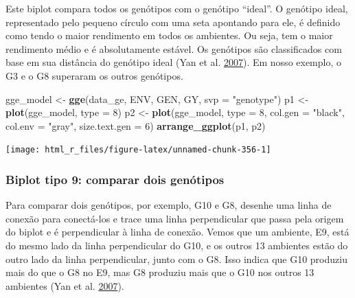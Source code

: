 \documentclass[
]{book}
\newenvironment{Shaded}{\begin{snugshade}}{\end{snugshade}}
\newcommand{\DataTypeTok}[1]{\textcolor[rgb]{0.13,0.29,0.53}{#1}}
\newcommand{\DecValTok}[1]{\textcolor[rgb]{0.00,0.00,0.81}{#1}}
\newcommand{\KeywordTok}[1]{\textcolor[rgb]{0.13,0.29,0.53}{\textbf{#1}}}
\newcommand{\NormalTok}[1]{#1}
\newcommand{\StringTok}[1]{\textcolor[rgb]{0.31,0.60,0.02}{#1}}
\numberwithin{equation}{section}
\newcommand{\indt}[1]{\index{#1|ST}}
\begin{document}
Este biplot compara todos os genótipos com o genótipo ``ideal''. O genótipo ideal, representado pelo pequeno círculo com uma seta apontando para ele, é definido como tendo o maior rendimento em todos os ambientes. Ou seja, tem o maior rendimento médio e é absolutamente estável. Os genótipos são classificados com base em sua distância do genótipo ideal (Yan et al. \protect\hyperlink{ref-Yan2007}{2007}). Em nosso exemplo, o G3 e o G8 superaram os outros genótipos.
\indt{biplot}

\begin{Shaded}
\begin{Highlighting}[]
\NormalTok{gge\_model \textless{}{-}}\StringTok{ }\KeywordTok{gge}\NormalTok{(data\_ge, ENV, GEN, GY, }\DataTypeTok{svp =} \StringTok{"genotype"}\NormalTok{)}
\NormalTok{p1 \textless{}{-}}\StringTok{ }\KeywordTok{plot}\NormalTok{(gge\_model, }\DataTypeTok{type =} \DecValTok{8}\NormalTok{)}
\NormalTok{p2 \textless{}{-}}\StringTok{ }\KeywordTok{plot}\NormalTok{(gge\_model,}
           \DataTypeTok{type =} \DecValTok{8}\NormalTok{,}
           \DataTypeTok{col.gen =} \StringTok{"black"}\NormalTok{,}
           \DataTypeTok{col.env =} \StringTok{"gray"}\NormalTok{,}
           \DataTypeTok{size.text.gen =} \DecValTok{6}\NormalTok{)}
\KeywordTok{arrange\_ggplot}\NormalTok{(p1, p2)}
\end{Highlighting}
\end{Shaded}

\begin{center}\texttt{[image: html\_r\_files/figure-latex/unnamed-chunk-356-1]} \end{center}

\hypertarget{biplot-tipo-9-comparar-dois-genuxf3tipos}{%
\subsubsection{Biplot tipo 9: comparar dois genótipos}\label{biplot-tipo-9-comparar-dois-genuxf3tipos}}

Para comparar dois genótipos, por exemplo, G10 e G8, desenhe uma linha de conexão para conectá-los e trace uma linha perpendicular que passa pela origem do biplot e é perpendicular à linha de conexão. Vemos que um ambiente, E9, está do mesmo lado da linha perpendicular do G10, e os outros 13 ambientes estão do outro lado da linha perpendicular, junto com o G8. Isso indica que G10 produziu mais do que o G8 no E9, mas G8 produziu mais que o G10 nos outros 13 ambientes (Yan et al. \protect\hyperlink{ref-Yan2007}{2007}).
\indt{biplot}
\end{document}
